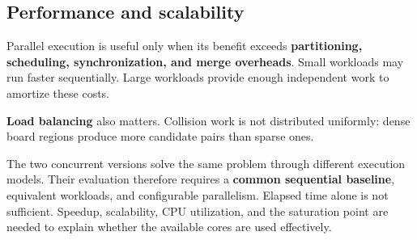 \subsection{Performance and scalability}

Parallel execution is useful only when its benefit exceeds \textbf{partitioning, scheduling, synchronization, and merge overheads}.
Small workloads may run faster sequentially.
Large workloads provide enough independent work to amortize these costs.

\textbf{Load balancing} also matters.
Collision work is not distributed uniformly: dense board regions produce more candidate pairs than sparse ones.

The two concurrent versions solve the same problem through different execution models.
Their evaluation therefore requires a \textbf{common sequential baseline}, equivalent workloads, and configurable parallelism.
Elapsed time alone is not sufficient.
Speedup, scalability, CPU utilization, and the saturation point are needed to explain whether the available cores are used effectively.
